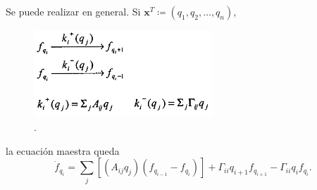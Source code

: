 \documentclass{beamer}
\begin{document}
\begin{frame}
Se puede realizar en general. Si $\mathbf{x}^T \coloneqq (q_1,q_2,\dots,q_n)$, 
\begin{figure}[p]
    \centering
    \includegraphics[width=0.6\textwidth]{scheme2.png}\\
    \tiny \cite{p1}.
\end{figure}
la ecuaci\'on maestra queda
\begin{equation*}
\dot{f}_{q_i} = \sum_j \left[\left(A_{ij}q_j\right) \left(f_{q_{i-1}} - f_{q_i}\right)\right] + \Gamma_{ii}q_{i+1}f_{q_{i+1}} -\Gamma_{ii}q_if_{q_i}.
\end{equation*}
\end{frame}
\end{document}
